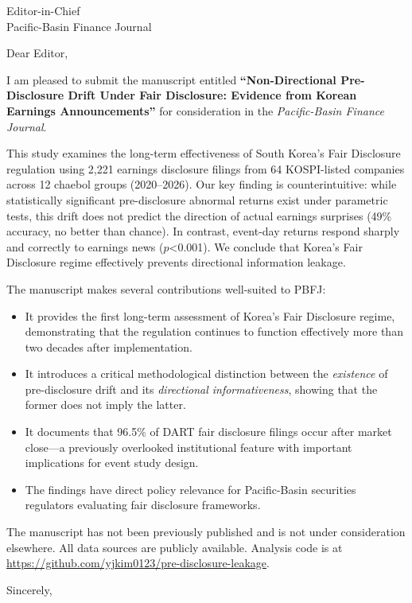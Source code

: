 \documentclass[11pt]{letter}
\begin{document}
\begin{letter}{Editor-in-Chief\\Pacific-Basin Finance Journal}

\opening{Dear Editor,}

I am pleased to submit the manuscript entitled \textbf{``Non-Directional Pre-Disclosure Drift Under Fair Disclosure: Evidence from Korean Earnings Announcements''} for consideration in the \textit{Pacific-Basin Finance Journal}.

This study examines the long-term effectiveness of South Korea's Fair Disclosure regulation using 2,221 earnings disclosure filings from 64 KOSPI-listed companies across 12 chaebol groups (2020--2026). Our key finding is counterintuitive: while statistically significant pre-disclosure abnormal returns exist under parametric tests, this drift does not predict the direction of actual earnings surprises (49\% accuracy, no better than chance). In contrast, event-day returns respond sharply and correctly to earnings news ($p$<0.001). We conclude that Korea's Fair Disclosure regime effectively prevents directional information leakage.

The manuscript makes several contributions well-suited to PBFJ:
\begin{itemize}
    \item It provides the first long-term assessment of Korea's Fair Disclosure regime, demonstrating that the regulation continues to function effectively more than two decades after implementation.
    \item It introduces a critical methodological distinction between the \textit{existence} of pre-disclosure drift and its \textit{directional informativeness}, showing that the former does not imply the latter.
    \item It documents that 96.5\% of DART fair disclosure filings occur after market close---a previously overlooked institutional feature with important implications for event study design.
    \item The findings have direct policy relevance for Pacific-Basin securities regulators evaluating fair disclosure frameworks.
\end{itemize}

The manuscript has not been previously published and is not under consideration elsewhere. All data sources are publicly available. Analysis code is at \url{https://github.com/yjkim0123/pre-disclosure-leakage}.

\closing{Sincerely,}

\end{letter}
\end{document}
